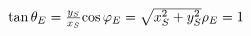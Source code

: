 \documentclass{article}
\begin{document}
\begin{math}
$$\tan{\theta_E} = \frac{y_S}{x_S}$$
\\
\\
$$\cos{\varphi_E} = \sqrt{x_S^2 + y_S^2}$$
\\
\\
$$\rho_E = 1$$
\end{math}
\end{document}
